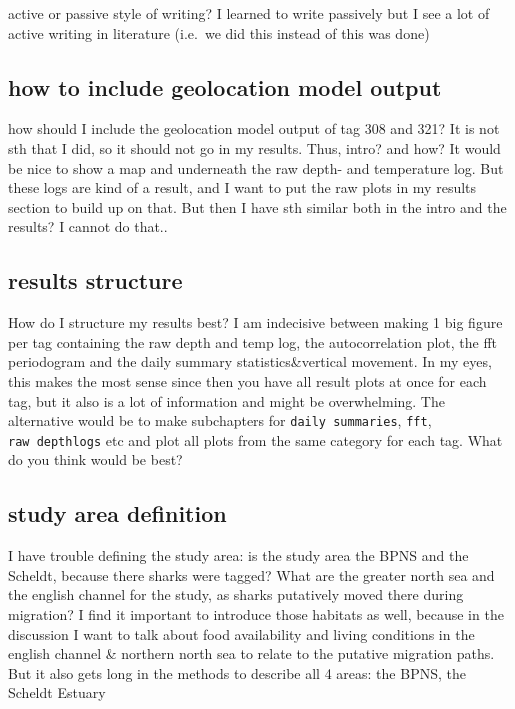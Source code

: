 \documentclass[
  authoryear,
  review,
  3p]{elsarticle}
\begin{document}
active or passive style of writing? I learned to write passively but I
see a lot of active writing in literature (i.e.~we did this instead of
this was done)

\hypertarget{sec-questiongeolocation}{%
\subsection{how to include geolocation model
output}\label{sec-questiongeolocation}}

how should I include the geolocation model output of tag 308 and 321? It
is not sth that I did, so it should not go in my results. Thus, intro?
and how? It would be nice to show a map and underneath the raw depth-
and temperature log. But these logs are kind of a result, and I want to
put the raw plots in my results section to build up on that. But then I
have sth similar both in the intro and the results? I cannot do that..

\hypertarget{sec_questionresultstructure}{%
\subsection{results structure}\label{sec_questionresultstructure}}

How do I structure my results best? I am indecisive between making 1 big
figure per tag containing the raw depth and temp log, the
autocorrelation plot, the fft periodogram and the daily summary
statistics\&vertical movement. In my eyes, this makes the most sense
since then you have all result plots at once for each tag, but it also
is a lot of information and might be overwhelming. The alternative would
be to make subchapters for \texttt{daily\ summaries}, \texttt{fft},
\texttt{raw\ depthlogs} etc and plot all plots from the same category
for each tag. What do you think would be best?

\hypertarget{sec-questionstudyarea}{%
\subsection{study area definition}\label{sec-questionstudyarea}}

I have trouble defining the study area: is the study area the BPNS and
the Scheldt, because there sharks were tagged? What are the greater
north sea and the english channel for the study, as sharks putatively
moved there during migration? I find it important to introduce those
habitats as well, because in the discussion I want to talk about food
availability and living conditions in the english channel \& northern
north sea to relate to the putative migration paths. But it also gets
long in the methods to describe all 4 areas: the BPNS, the Scheldt
Estuary
\end{document}
